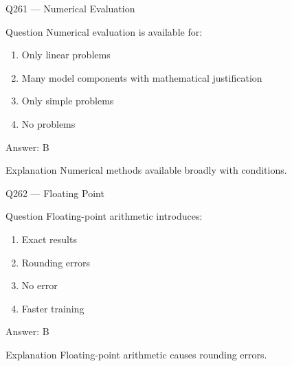 \documentclass[aspectratio=169,8pt]{beamer}
\begin{document}
								\begin{frame}{Q261 --- Numerical Evaluation}
									\begin{block}{Question}
										Numerical evaluation is available for:
										\begin{enumerate}
											\item Only linear problems
											\item Many model components with mathematical justification
											\item Only simple problems
											\item No problems
										\end{enumerate}
									\end{block}
									\begin{exampleblock}{Answer: B}\end{exampleblock}
									\begin{block}{Explanation}
										Numerical methods available broadly with conditions.
									\end{block}
								\end{frame}
								
								\begin{frame}{Q262 --- Floating Point}
									\begin{block}{Question}
										Floating-point arithmetic introduces:
										\begin{enumerate}
											\item Exact results
											\item Rounding errors
											\item No error
											\item Faster training
										\end{enumerate}
									\end{block}
									\begin{exampleblock}{Answer: B}\end{exampleblock}
									\begin{block}{Explanation}
										Floating-point arithmetic causes rounding errors.
									\end{block}
								\end{frame}
								
\end{document}

